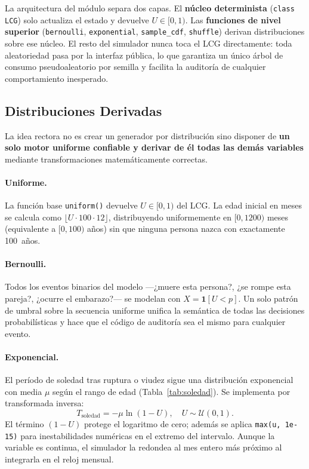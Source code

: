 \documentclass{llncs}
\begin{document}
La arquitectura del módulo separa dos capas.
El \textbf{núcleo determinista} (\texttt{class LCG}) solo actualiza el
estado y devuelve $U \in [0,1)$.
Las \textbf{funciones de nivel superior} (\texttt{bernoulli},
\texttt{exponential}, \texttt{sample\_cdf}, \texttt{shuffle}) derivan
distribuciones sobre ese núcleo.
El resto del simulador nunca toca el LCG directamente: toda aleatoriedad
pasa por la interfaz pública, lo que garantiza un único árbol de consumo
pseudoaleatorio por semilla y facilita la auditoría de cualquier
comportamiento inesperado.

\subsection{Distribuciones Derivadas}

La idea rectora no es crear un generador por distribución sino disponer de
\textbf{un solo motor uniforme confiable y derivar de él todas las demás
variables} mediante transformaciones matemáticamente correctas.

\paragraph{Uniforme.}
La función base \texttt{uniform()} devuelve $U\in[0,1)$ del LCG\@.
La edad inicial en meses se calcula como
$\lfloor U \cdot 100 \cdot 12 \rfloor$,
distribuyendo uniformemente en $[0,1200)$ meses (equivalente a
$[0,100)$ años) sin que ninguna persona nazca con exactamente 100~años.

\paragraph{Bernoulli.}
Todos los eventos binarios del modelo ---¿muere esta persona?, ¿se rompe
esta pareja?, ¿ocurre el embarazo?--- se modelan con $X = \mathbf{1}[U<p]$.
Un solo patrón de umbral sobre la secuencia uniforme unifica la semántica
de todas las decisiones probabilísticas y hace que el código de auditoría
sea el mismo para cualquier evento.

\paragraph{Exponencial.}
El período de soledad tras ruptura o viudez sigue una distribución
exponencial con media $\mu$ según el rango de edad (Tabla~\ref{tab:soledad}).
Se implementa por transformada inversa:
\[
  T_{\text{soledad}} = -\mu \ln(1 - U), \quad U \sim \mathcal{U}(0,1).
\]
El término $(1-U)$ protege el logaritmo de cero; además se aplica
\texttt{max(u, 1e-15)} para inestabilidades numéricas en el extremo del
intervalo.
Aunque la variable es continua, el simulador la redondea al mes entero
más próximo al integrarla en el reloj mensual.
\end{document}
